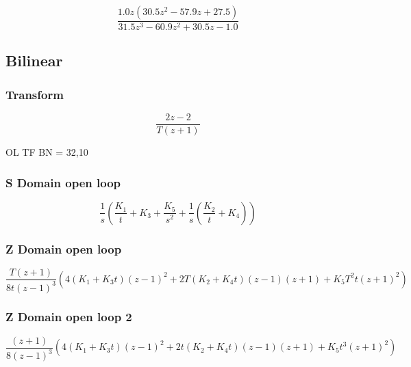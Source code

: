 \begin{equation}
\frac{1.0 z \left(30.5 z^{2} - 57.9 z + 27.5\right)}{31.5 z^{3} - 60.9 z^{2} + 30.5 z - 1.0}
\end{equation}


\cite{arashBook}
\clearpage


\subsection{Bilinear}

\subsubsection{Transform}
\begin{equation}
\frac{2 z - 2}{T \left(z + 1\right)}
\end{equation}

OL TF BN = 32,10

\subsubsection{S Domain open loop}
\begin{equation}
\frac{1}{s} \left(\frac{K_{1}}{t} + K_{3} + \frac{K_{5}}{s^{2}} + \frac{1}{s} \left(\frac{K_{2}}{t} + K_{4}\right)\right)
\end{equation}

\subsubsection{Z Domain open loop}

\begin{equation}
\frac{T\left(z + 1\right) }{8 t \left(z - 1\right)^{3}} \left(4(K_{1}  + K_{3} t)  \left(z - 1\right)^{2}  + 2 T \left(K_{2} + K_{4} t\right) \left(z - 1\right) \left(z + 1\right) + K_{5} T^{2} t \left(z + 1\right)^{2} \right)
\end{equation}

\subsubsection{Z Domain open loop 2}
\begin{equation}
\frac{\left(z + 1\right)}{8 \left(z - 1\right)^{3}} \left(4(K_{1}  + K_{3} t)  \left(z - 1\right)^{2} + 2 t \left(K_{2} + K_{4} t\right) \left(z - 1\right) \left(z + 1\right) + K_{5} t^{3} \left(z + 1\right)^{2}\right)
\end{equation}


